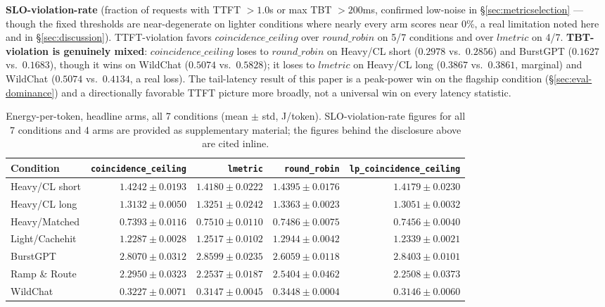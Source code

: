 \documentclass[sigconf,review,anonymous]{acmart}
\begin{document}
\textbf{SLO-violation-rate} (fraction of requests with TTFT $>1.0$s or max TBT $>200$ms,
confirmed low-noise in \S\ref{sec:metricselection} --- though the fixed thresholds are
near-degenerate on lighter conditions where nearly every arm scores near 0\%, a real
limitation noted here and in \S\ref{sec:discussion}). TTFT-violation favors
$\mathit{coincidence\_ceiling}$ over $\mathit{round\_robin}$ on 5/7 conditions and over
$\mathit{lmetric}$ on 4/7. \textbf{TBT-violation is genuinely mixed}:
$\mathit{coincidence\_ceiling}$ loses to $\mathit{round\_robin}$ on Heavy/CL short ($0.2978$
vs.\ $0.2856$) and BurstGPT ($0.1627$ vs.\ $0.1683$), though it wins on WildChat ($0.5074$
vs.\ $0.5828$); it loses to $\mathit{lmetric}$ on Heavy/CL long ($0.3867$ vs.\ $0.3861$,
marginal) and WildChat ($0.5074$ vs.\ $0.4134$, a real loss). The tail-latency result of this
paper is a peak-power win on the flagship condition (\S\ref{sec:eval-dominance}) and a
directionally favorable TTFT picture more broadly, not a universal win on every latency
statistic.

\begin{table}[t]
  \caption{Energy-per-token, headline arms, all 7 conditions (mean $\pm$ std, J/token).
    SLO-violation-rate figures for all 7 conditions and 4 arms are provided as supplementary
    material; the figures behind the disclosure above are cited inline.}
  \label{tab:energyslo}
  \footnotesize
  \setlength{\tabcolsep}{3pt}
  \begin{tabular}{@{}lrrrr@{}}
    \toprule
    Condition & \texttt{coincidence\_ceiling} & \texttt{lmetric} & \texttt{round\_robin} & \texttt{lp\_coincidence\_ceiling} \\
    \midrule
    Heavy/CL short  & $1.4242{\pm}0.0193$ & $1.4180{\pm}0.0222$ & $1.4395{\pm}0.0176$ & $1.4179{\pm}0.0230$ \\
    Heavy/CL long   & $1.3132{\pm}0.0050$ & $1.3251{\pm}0.0242$ & $1.3363{\pm}0.0023$ & $1.3051{\pm}0.0032$ \\
    Heavy/Matched   & $0.7393{\pm}0.0116$ & $0.7510{\pm}0.0110$ & $0.7486{\pm}0.0075$ & $0.7456{\pm}0.0040$ \\
    Light/Cachehit  & $1.2287{\pm}0.0028$ & $1.2517{\pm}0.0102$ & $1.2944{\pm}0.0042$ & $1.2339{\pm}0.0021$ \\
    BurstGPT        & $2.8070{\pm}0.0312$ & $2.8599{\pm}0.0235$ & $2.6059{\pm}0.0118$ & $2.8403{\pm}0.0101$ \\
    Ramp \& Route   & $2.2950{\pm}0.0323$ & $2.2537{\pm}0.0187$ & $2.5404{\pm}0.0462$ & $2.2508{\pm}0.0373$ \\
    WildChat        & $0.3227{\pm}0.0071$ & $0.3147{\pm}0.0045$ & $0.3448{\pm}0.0004$ & $0.3146{\pm}0.0060$ \\
    \bottomrule
  \end{tabular}
\end{table}
\end{document}
